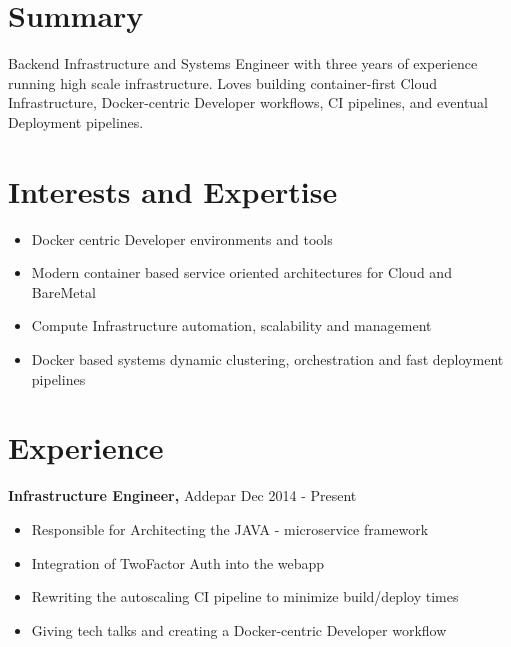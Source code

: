 \documentclass[margin]{res}
\begin{document}

\address{ \textbf{Web}:\hspace{1mm}\href{http://ankush.io/}{ankush.io}\hspace{5mm} \textbf{Github}:\hspace{1mm}\href{https://github.com/ankushagarwal}{ankushagarwal}\hspace{5mm}      \textbf{Email}:\hspace{1mm}\href{mailto:ankushagarwal11@gmail.com}{ankushagarwal11@gmail.com} }

\begin{resume}

\section{Summary}

  Backend Infrastructure and Systems Engineer with three years of experience running high scale infrastructure. Loves building container-first Cloud Infrastructure, Docker-centric Developer workflows, CI pipelines, and eventual Deployment pipelines.


\section{Interests and Expertise}
 \begin{itemize} \itemsep -2pt  %
  \item Docker centric Developer environments and tools 
 \item Modern container based service oriented architectures for Cloud and BareMetal
 \item Compute Infrastructure automation, scalability and management
 \item Docker based systems dynamic clustering, orchestration and fast deployment pipelines
 \end{itemize}

\section{Experience}
 {\bf Infrastructure Engineer,} Addepar \hfill Dec  2014  - Present
 \begin{itemize} \itemsep -2pt  %
 \item Responsible for Architecting the JAVA - microservice framework
 \item Integration of TwoFactor Auth into the webapp
 \item Rewriting the autoscaling CI pipeline to minimize build/deploy times
 \item Giving tech talks and creating a Docker-centric Developer workflow
 \end{itemize}


\end{resume}
\end{document}
